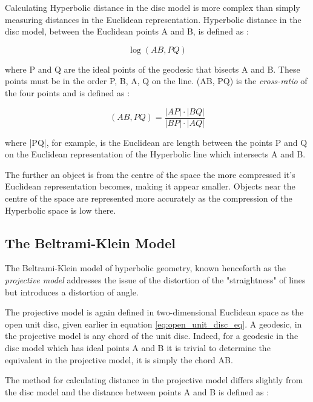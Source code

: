Calculating Hyperbolic distance in the disc model is more complex than simply measuring distances in the Euclidean representation. Hyperbolic distance in the disc model, between the Euclidean points A and B, is defined as \cite{blair_inversion_2000}:

\begin{equation}
\label{distance_disc_model}
\log(AB,PQ)
\end{equation}

where P and Q are the ideal points of the geodesic that bisects A and B. These points must be in the order P, B, A, Q on the line. (AB, PQ) is the \textit{cross-ratio} of the four points and is defined as \cite{blair_inversion_2000}:

\begin{equation}
\label{cross_ratio}
(AB,PQ) = \frac{|AP|\cdot|BQ|}{|BP|\cdot|AQ|}
\end{equation}

where |PQ|, for example, is the Euclidean arc length between the points P and Q on the Euclidean representation of the Hyperbolic line which intersects A and B.

The further an object is from the centre of the space the more compressed it's Euclidean representation becomes, making it appear smaller. Objects near the centre of the space are represented more accurately as the compression of the Hyperbolic space is low there.

\subsection{The Beltrami-Klein Model}

The Beltrami-Klein model of hyperbolic geometry, known henceforth as the \textit{projective model} addresses the issue of the distortion of the "straightness" of lines but introduces a distortion of angle.

The projective model is again defined in two-dimensional Euclidean space as the open unit disc, given earlier in equation \ref{eq:open_unit_disc_eq}. A geodesic, in the projective model is any chord of the unit disc. Indeed, for a geodesic in the disc model which has ideal points A and B it is trivial to determine the equivalent in the projective model, it is simply the chord AB.

The method for calculating distance in the projective model differs slightly from the disc model and the distance between points A and B is defined as \cite{milnor_hyperbolic_1982}:

